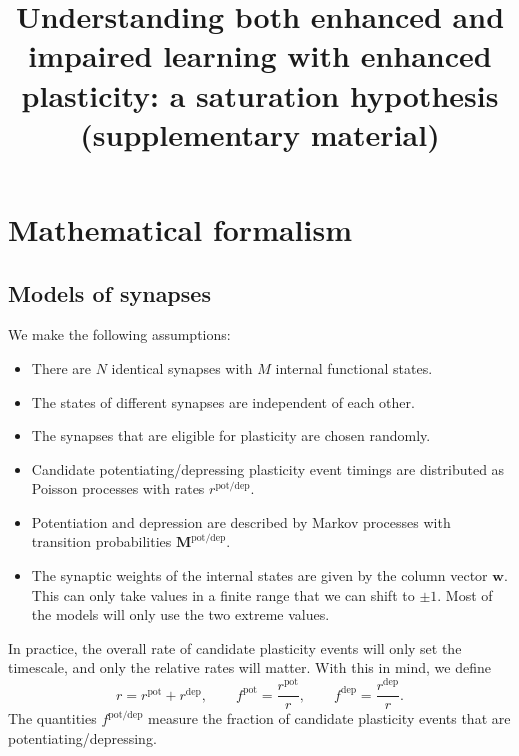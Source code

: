 \documentclass[10pt]{article}
\title{Understanding both enhanced and impaired learning with enhanced plasticity: a saturation hypothesis (supplementary material)}
\date{}
\newcommand{\w}{\mathbf{w}}
\newcommand{\M}{\mathbf{M}}
\newcommand{\pot}{^{\text{pot}}}
\newcommand{\dep}{^{\text{dep}}}
\newcommand{\potdep}{^{\text{pot/dep}}}
\begin{document}
\setcounter{page}{8}
\setcounter{figure}{7}
\maketitle







\section{Mathematical formalism}\label{sec:setup}


\subsection{Models of synapses}\label{sec:synapse}

We make the following assumptions:
\begin{itemize}
  \item There are $N$ identical synapses with $M$ internal functional states.
  \item The states of different synapses are independent of each other.
  \item The synapses that are eligible for plasticity are chosen randomly.
  \item Candidate potentiating/depressing plasticity event timings are distributed as Poisson processes with rates $r\potdep$.
  \item Potentiation and depression are described by Markov processes with transition probabilities $\M\potdep$.
  \item The synaptic weights of the internal states are given by the column vector $\w$. This can only take values in a finite range that we can shift to $\pm1$. Most of the models will only use the two extreme values.
\end{itemize}

In practice, the overall rate of candidate plasticity events will only set the timescale, and only the relative rates will matter.
With this in mind, we define
%
\begin{equation}\label{eq:fpotdep}
  r = r\pot + r\dep,
  \qquad
  f\pot = \frac{r\pot}{r},
  \qquad
  f\dep = \frac{r\dep}{r}.
\end{equation}
%
The quantities $f\potdep$ measure the fraction of candidate plasticity events that are potentiating/depressing.
\end{document}
